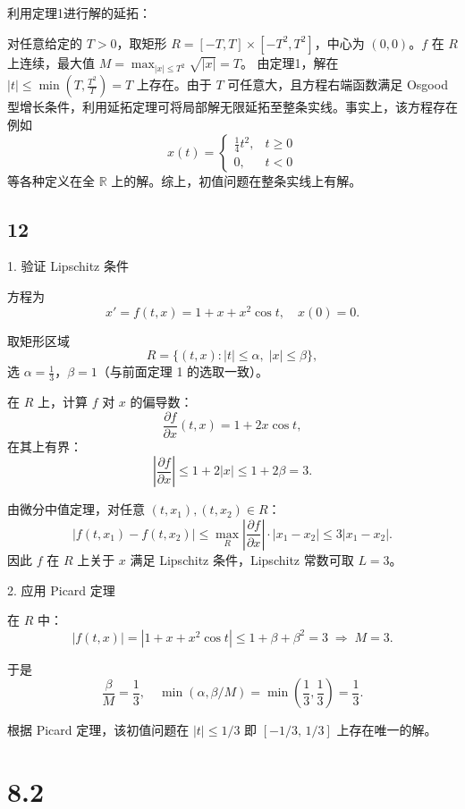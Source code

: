 \documentclass{article}
\begin{document}
利用定理1进行解的延拓： 

对任意给定的 \(T > 0\)，取矩形 \(R = [-T, T] \times [-T^2, T^2]\)，中心为 \((0,0)\)。\(f\) 在 \(R\) 上连续，最大值 \(M = \max_{|x| \le T^2} \sqrt{|x|} = T\)。  
由定理1，解在 \(|t| \le \min\left(T, \frac{T^2}{T}\right) = T\) 上存在。由于 \(T\) 可任意大，且方程右端函数满足 Osgood 型增长条件，利用延拓定理可将局部解无限延拓至整条实线。事实上，该方程存在例如
\[
x(t) = \begin{cases} 
\frac{1}{4}t^2, & t \ge 0 \\
0, & t < 0
\end{cases}
\]
等各种定义在全 \(\mathbb{R}\) 上的解。综上，初值问题在整条实线上有解。
\subsection*{12}

1. 验证 Lipschitz 条件

方程为  
\[
x' = f(t,x) = 1 + x + x^2\cos t, \quad x(0)=0.
\]

取矩形区域  
\[
R = \{(t,x) : |t| \le \alpha,\; |x| \le \beta\},
\]
选 \(\alpha = \frac13\)，\(\beta = 1\)（与前面定理 1 的选取一致）。

在 \(R\) 上，计算 \(f\) 对 \(x\) 的偏导数：  
\[
\frac{\partial f}{\partial x}(t,x) = 1 + 2x\cos t,
\]
在其上有界：
\[
\left|\frac{\partial f}{\partial x}\right| \le 1 + 2|x| \le 1 + 2\beta = 3.
\]

由微分中值定理，对任意 \((t,x_1),(t,x_2)\in R\)：
\[
|f(t,x_1)-f(t,x_2)| \le \max_{R}\left|\frac{\partial f}{\partial x}\right|\cdot|x_1-x_2| \le 3|x_1-x_2|.
\]
因此 \(f\) 在 \(R\) 上关于 \(x\) 满足 Lipschitz 条件，Lipschitz 常数可取 \(L=3\)。

2. 应用 Picard 定理


在 \(R\) 中：
\[
|f(t,x)| = |1 + x + x^2\cos t| \le 1 + \beta + \beta^2 = 3 \;\Rightarrow\; M=3.
\]

于是  
\[
\frac{\beta}{M} = \frac13,\quad \min(\alpha, \beta/M) = \min\!\left(\frac13, \frac13\right) = \frac13.
\]

根据 Picard 定理，该初值问题在 \(|t| \le 1/3\) 即 \([-1/3,\,1/3]\) 上存在唯一的解。

\section*{8.2}
\end{document}

